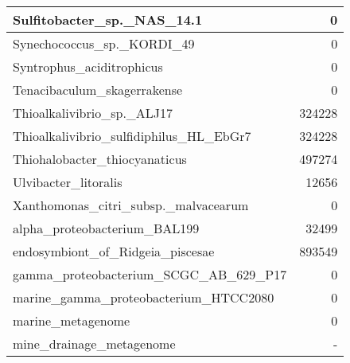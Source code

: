 \documentclass[12pt,a4paper]{article}
\begin{document}
\begin{table}[ht]
\begin{center}
\begin{tabular}{|l*{1}{|r}|}
Sulfitobacter\_sp.\_NAS\_14.1 & 0 \\ \hline
Synechococcus\_sp.\_KORDI\_49 & 0 \\ \hline
Syntrophus\_aciditrophicus & 0 \\ \hline
Tenacibaculum\_skagerrakense & 0 \\ \hline
Thioalkalivibrio\_sp.\_ALJ17 & 324228 \\ \hline
Thioalkalivibrio\_sulfidiphilus\_HL\_EbGr7 & 324228 \\ \hline
Thiohalobacter\_thiocyanaticus & 497274 \\ \hline
Ulvibacter\_litoralis & 12656 \\ \hline
Xanthomonas\_citri\_subsp.\_malvacearum & 0 \\ \hline
alpha\_proteobacterium\_BAL199 & 32499 \\ \hline
endosymbiont\_of\_Ridgeia\_piscesae & 893549 \\ \hline
gamma\_proteobacterium\_SCGC\_AB\_629\_P17 & 0 \\ \hline
marine\_gamma\_proteobacterium\_HTCC2080 & 0 \\ \hline
marine\_metagenome & 0 \\ \hline
mine\_drainage\_metagenome & - \\ \hline
\end{tabular}
\end{center}
\end{table}
\end{document}
